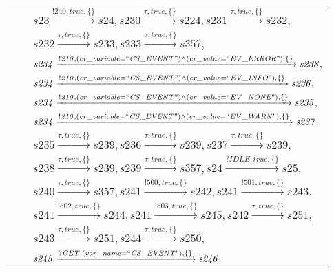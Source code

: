 \begin{tabular}{lcp{350px}}
& & $\mathit{s23}\xrightarrow{\mathit{!240}, \mathit{true}, \{\}}\mathit{s24},\mathit{s230}\xrightarrow{\mathit{\tau}, \mathit{true}, \{\}}\mathit{s224},\mathit{s231}\xrightarrow{\mathit{\tau}, \mathit{true}, \{\}}\mathit{s232},$ \\
& & $\mathit{s232}\xrightarrow{\mathit{\tau}, \mathit{true}, \{\}}\mathit{s233},\mathit{s233}\xrightarrow{\mathit{\tau}, \mathit{true}, \{\}}\mathit{s357},$ \\
& & $\mathit{s234}\xrightarrow{\mathit{!210}, \mathit{(cr\_variable = ``CS\_EVENT") \land (cr\_value = ``EV\_ERROR")}, \{\}}\mathit{s238},$ \\
& & $\mathit{s234}\xrightarrow{\mathit{!210}, \mathit{(cr\_variable = ``CS\_EVENT") \land (cr\_value = ``EV\_INFO")}, \{\}}\mathit{s236},$ \\
& & $\mathit{s234}\xrightarrow{\mathit{!210}, \mathit{(cr\_variable = ``CS\_EVENT") \land (cr\_value = ``EV\_NONE")}, \{\}}\mathit{s235},$ \\
& & $\mathit{s234}\xrightarrow{\mathit{!210}, \mathit{(cr\_variable = ``CS\_EVENT") \land (cr\_value = ``EV\_WARN")}, \{\}}\mathit{s237},$ \\
& & $\mathit{s235}\xrightarrow{\mathit{\tau}, \mathit{true}, \{\}}\mathit{s239},\mathit{s236}\xrightarrow{\mathit{\tau}, \mathit{true}, \{\}}\mathit{s239},\mathit{s237}\xrightarrow{\mathit{\tau}, \mathit{true}, \{\}}\mathit{s239},$ \\
& & $\mathit{s238}\xrightarrow{\mathit{\tau}, \mathit{true}, \{\}}\mathit{s239},\mathit{s239}\xrightarrow{\mathit{\tau}, \mathit{true}, \{\}}\mathit{s357},\mathit{s24}\xrightarrow{\mathit{?IDLE}, \mathit{true}, \{\}}\mathit{s25},$ \\
& & $\mathit{s240}\xrightarrow{\mathit{\tau}, \mathit{true}, \{\}}\mathit{s357},\mathit{s241}\xrightarrow{\mathit{!500}, \mathit{true}, \{\}}\mathit{s242},\mathit{s241}\xrightarrow{\mathit{!501}, \mathit{true}, \{\}}\mathit{s243},$ \\
& & $\mathit{s241}\xrightarrow{\mathit{!502}, \mathit{true}, \{\}}\mathit{s244},\mathit{s241}\xrightarrow{\mathit{!503}, \mathit{true}, \{\}}\mathit{s245},\mathit{s242}\xrightarrow{\mathit{\tau}, \mathit{true}, \{\}}\mathit{s251},$ \\
& & $\mathit{s243}\xrightarrow{\mathit{\tau}, \mathit{true}, \{\}}\mathit{s251},\mathit{s244}\xrightarrow{\mathit{\tau}, \mathit{true}, \{\}}\mathit{s250},$ \\
& & $\mathit{s245}\xrightarrow{\mathit{?GET}, \mathit{(var\_name = ``CS\_EVENT")}, \{\}}\mathit{s246},$ \\

\end{tabular}
